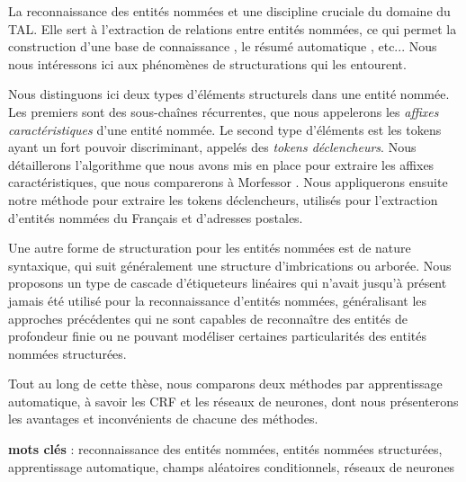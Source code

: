 \documentclass[PhD-Yoann-Dupont.tex]{subfiles}
\begin{document}
La reconnaissance des entités nommées et une discipline cruciale du domaine du TAL. Elle sert à l'extraction de relations entre entités nommées, ce qui permet la construction d'une base de connaissance \citep{surdeanu2014overview}, le résumé automatique \citep{nobata2002summarization}, etc... Nous nous intéressons ici aux phénomènes de structurations qui les entourent.

Nous distinguons ici deux types d'éléments structurels dans une entité nommée. Les premiers sont des sous-chaînes récurrentes, que nous appelerons les \emph{affixes caractéristiques} d'une entité nommée. Le second type d'éléments est les tokens ayant un fort pouvoir discriminant, appelés des \emph{tokens déclencheurs}. Nous détaillerons l'algorithme que nous avons mis en place pour extraire les affixes caractéristiques, que nous comparerons à Morfessor \citep{creutz2005unsupervised}. Nous appliquerons ensuite notre méthode pour extraire les tokens déclencheurs, utilisés pour l'extraction d'entités nommées du Français et d'adresses postales.

Une autre forme de structuration pour les entités nommées est de nature syntaxique, qui suit généralement une structure d'imbrications ou arborée. Nous proposons un type de cascade d'étiqueteurs linéaires qui n'avait jusqu'à présent jamais été utilisé pour la reconnaissance d'entités nommées, généralisant les approches précédentes qui ne sont capables de reconnaître des entités de profondeur finie ou ne pouvant modéliser certaines particularités des entités nommées structurées.

Tout au long de cette thèse, nous comparons deux méthodes par apprentissage automatique, à savoir les CRF et les réseaux de neurones, dont nous présenterons les avantages et inconvénients de chacune des méthodes.

\begin{flushleft}
\textbf{mots clés} : reconnaissance des entités nommées, entités nommées structurées, apprentissage automatique, champs aléatoires conditionnels, réseaux de neurones
\end{flushleft}
\end{document}
